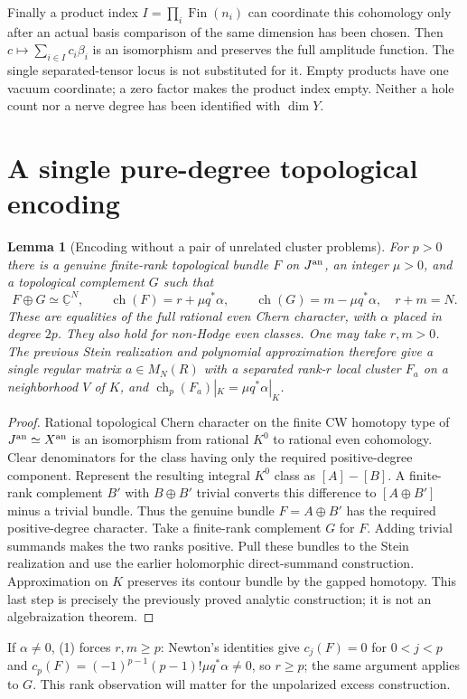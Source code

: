\documentclass[11pt]{article}
\newtheorem{lemma}[theorem]{Lemma}
\newcommand{\ch}{\operatorname{ch}}
\begin{document}
Finally a product index $I=\prod_i\operatorname{Fin}(n_i)$ can coordinate
this cohomology only after an actual basis comparison of the same dimension
has been chosen. Then $c\mapsto\sum_{i\in I}c_i\beta_i$ is an isomorphism
and preserves the full amplitude function. The single separated-tensor
locus is not substituted for it. Empty products have one vacuum coordinate;
a zero factor makes the product index empty. Neither a hole count nor a
nerve degree has been identified with $\dim Y$.

\section{A single pure-degree topological encoding}
\begin{lemma}[Encoding without a pair of unrelated cluster problems]
For $p>0$ there is a genuine finite-rank topological bundle $F$ on
$J^{\rm an}$, an integer $\mu>0$, and a topological complement $G$ such that
\[
 F\oplus G\simeq\underline{\mathbb C}^{N},\qquad
 \ch(F)=r+\mu q^*\alpha,\qquad
 \ch(G)=m-\mu q^*\alpha,\quad r+m=N.                    \tag{1}
\]
These are equalities of the full rational even Chern character, with
$\alpha$ placed in degree $2p$. They also hold for non-Hodge even classes.
One may take $r,m>0$. The previous Stein realization and polynomial
approximation therefore give a single regular matrix $a\in M_N(R)$
with a separated rank-$r$ local cluster $F_a$ on a neighborhood $V$ of $K$,
and $\ch_p(F_a)|_K=\mu q^*\alpha|_K$.
\end{lemma}
\begin{proof}
Rational topological Chern character on the finite CW homotopy type of
$J^{\rm an}\simeq X^{\rm an}$ is an isomorphism from rational $K^0$ to
rational even cohomology. Clear denominators for the class having only
the required positive-degree component. Represent the resulting integral
$K^0$ class as $[A]-[B]$. A finite-rank complement $B'$ with
$B\oplus B'$ trivial converts this difference to $[A\oplus B']$ minus
a trivial bundle. Thus the genuine bundle $F=A\oplus B'$ has the required
positive-degree character. Take a finite-rank complement $G$ for $F$.
Adding trivial summands makes the two ranks positive.
Pull these bundles to the Stein realization and use the earlier holomorphic
direct-summand construction. Approximation on $K$ preserves its contour
bundle by the gapped homotopy. This last step is precisely the previously
proved analytic construction; it is not an algebraization theorem.
\end{proof}
If $\alpha\ne0$, (1) forces $r,m\geq p$: Newton's identities give
$c_j(F)=0$ for $0<j<p$ and
$c_p(F)=(-1)^{p-1}(p-1)!\mu q^*\alpha\ne0$, so $r\geq p$;
the same argument applies to $G$. This rank observation will matter for
the unpolarized excess construction.
\end{document}
